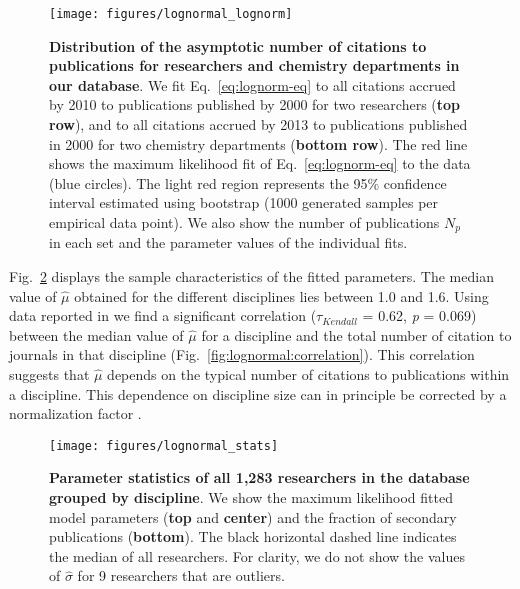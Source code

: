 \begin{figure}[t]
\texttt{[image: figures/lognormal\_lognorm]}
\caption[Distribution of the asymptotic number of citations to publications.]{\textbf{Distribution of the asymptotic number of citations to publications for researchers and chemistry departments in our database}. We fit Eq.~\eqref{eq:lognorm-eq} to all citations accrued by 2010 to publications published by 2000 for two researchers (\textbf{top row}), and to all citations accrued by 2013 to publications published in 2000 for two chemistry departments (\textbf{bottom row}). The red line shows the maximum likelihood fit of Eq.~\eqref{eq:lognorm-eq} to the data (blue circles). The light red region represents the 95\% confidence interval estimated using bootstrap (1000 generated samples per empirical data point). We also show the number of publications $N_p$ in each set and the parameter values of the individual fits.}
\label{fig:lognormal:lognorm}
\end{figure}

Fig.~\ref{fig:lognormal:stats} displays the sample characteristics of the fitted parameters. The median value of $\hat{\mu}$ obtained for the different disciplines lies between 1.0 and 1.6. Using data reported in \cite{Rosvall2008} we find a significant correlation ($\tau_{Kendall}$ = 0.62, \textit{p} = 0.069) between the median value of $\hat{\mu}$ for a discipline and the total number of citation to journals in that discipline (Fig.~\ref{fig:lognormal:correlation}). This correlation suggests that $\hat{\mu}$ depends on the typical number of citations to publications within a discipline. This dependence on discipline size can in principle be corrected by a normalization factor \cite{Radicchi2008, Castellano2009, Petersen2010}.

\begin{figure}[t]
\texttt{[image: figures/lognormal\_stats]}
\caption[Parameter statistics of all researchers.]{\textbf{Parameter statistics of all 1,283 researchers in the database grouped by discipline}. We show the maximum likelihood fitted model parameters (\textbf{top} and \textbf{center}) and the fraction of secondary publications (\textbf{bottom}). The black horizontal dashed line indicates the median of all researchers. For clarity, we do not show the values of $\hat{\sigma}$ for 9 researchers that are outliers.}
\label{fig:lognormal:stats}
\end{figure}

